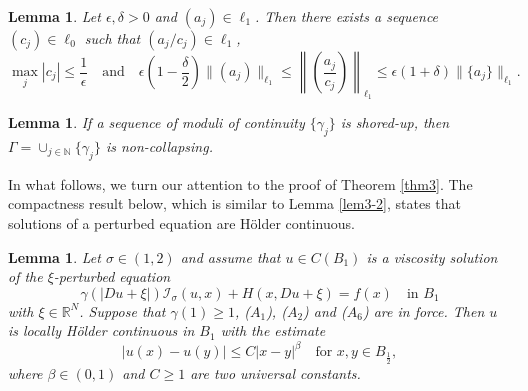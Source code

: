 \documentclass[11pt,reqno]{amsart}
\numberwithin{equation}{section}
\newtheorem{lemma}[theorem]{Lemma}
\begin{document}
\begin{lemma}
\label{lem5-0}
Let $\epsilon,\delta>0$ and $(a_j)\in \ell_1$. Then there exists a sequence $(c_j)\in \ell_0$ such that
$(a_j/c_j)\in\ell_1$,
\begin{equation*}
\max_j{|c_j|}\le\frac{1}{\epsilon}\quad \text{and}\quad  \epsilon\left(1-\frac{\delta}{2}\right)\|(a_j)\|_{\ell_1}\le\left\|\left(\frac{a_j}{c_j}\right)\right\|_{\ell_1}
\le\epsilon(1+\delta)\|\{a_j\}\|_{\ell_1}.
\end{equation*}
\end{lemma}

\begin{lemma}
\label{lem5-0-1}
If a sequence of moduli of continuity $\{\gamma_j\}$ is shored-up, then $\Gamma=\cup_{j\in\mathbb{N}}\{\gamma_j\}$ is non-collapsing.
\end{lemma}

In what follows, we turn our attention to the proof of Theorem \ref{thm3}.
The compactness result below, which is similar to Lemma \ref{lem3-2}, states that solutions of a perturbed equation are H\"{o}lder continuous.

\begin{lemma}
\label{lem5-1}
Let $\sigma\in(1,2)$ and assume that $u\in C(B_1)$ is a viscosity solution of the $\xi$-perturbed equation
\begin{equation}
\label{5-1-1}
\gamma(|Du+\xi|)\mathcal{I}_\sigma(u,x)+H(x,Du+\xi)=f(x) \quad\text{in } B_1
\end{equation}
with $\xi\in\mathbb{R}^N$. Suppose that $\gamma(1)\ge1$, ($A_1$), ($A_2$) and ($A_6$) are in force. Then $u$ is locally H\"{o}lder continuous in $B_1$ with the estimate
$$
|u(x)-u(y)|\le C|x-y|^\beta  \quad\text{for } x,y\in B_{\frac12},
$$
where $\beta\in (0,1)$ and $C\ge1$ are two universal constants.
\end{lemma}
\end{document}

